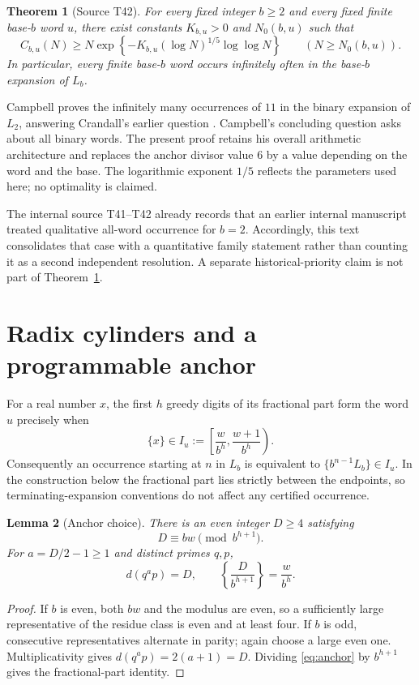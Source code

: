 \documentclass[11pt,a4paper]{article}
\newtheorem{theorem}{Theorem}[section]
\newtheorem{lemma}[theorem]{Lemma}
\theoremstyle{definition}\newtheorem{definition}[theorem]{Definition}
\theoremstyle{remark}\newtheorem{remark}[theorem]{Remark}
\begin{document}
\begin{theorem}[Source T42]\label{thm:main}
For every fixed integer $b\ge2$ and every fixed finite base-$b$ word $u$, there exist constants $K_{b,u}>0$ and $N_0(b,u)$ such that
\begin{equation}\label{eq:main}
 C_{b,u}(N)\ge N\exp\!\left\{-K_{b,u}(\log N)^{1/5}\log\log N\right\}
 \qquad(N\ge N_0(b,u)).
\end{equation}
In particular, every finite base-$b$ word occurs infinitely often in the base-$b$ expansion of $L_b$.
\end{theorem}

Campbell \cite{Campbell} proves the infinitely many occurrences of $11$ in the binary expansion of $L_2$, answering Crandall's earlier question \cite{Crandall}. Campbell's concluding question asks about all binary words. The present proof retains his overall arithmetic architecture and replaces the anchor divisor value $6$ by a value depending on the word and the base. The logarithmic exponent $1/5$ reflects the parameters used here; no optimality is claimed.

The internal source T41--T42 already records that an earlier internal manuscript treated qualitative all-word occurrence for $b=2$. Accordingly, this text consolidates that case with a quantitative family statement rather than counting it as a second independent resolution. A separate historical-priority claim is not part of Theorem~\ref{thm:main}.

\section{Radix cylinders and a programmable anchor}
For a real number $x$, the first $h$ greedy digits of its fractional part form the word $u$ precisely when
\[
 \{x\}\in I_u:=\left[\frac{w}{b^h},\frac{w+1}{b^h}\right).
\]
Consequently an occurrence starting at $n$ in $L_b$ is equivalent to $\{b^{n-1}L_b\}\in I_u$. In the construction below the fractional part lies strictly between the endpoints, so terminating-expansion conventions do not affect any certified occurrence.

\begin{lemma}[Anchor choice]\label{lem:anchor}
There is an even integer $D\ge4$ satisfying
\begin{equation}\label{eq:anchor}
 D\equiv bw\pmod {b^{h+1}}.
\end{equation}
For $a=D/2-1\ge1$ and distinct primes $q,p$,
\[
 d(q^ap)=D,
 \qquad
 \left\{\frac{D}{b^{h+1}}\right\}=\frac{w}{b^h}.
\]
\end{lemma}
\begin{proof}
If $b$ is even, both $bw$ and the modulus are even, so a sufficiently large representative of the residue class is even and at least four. If $b$ is odd, consecutive representatives alternate in parity; again choose a large even one. Multiplicativity gives $d(q^ap)=2(a+1)=D$. Dividing \eqref{eq:anchor} by $b^{h+1}$ gives the fractional-part identity.
\end{proof}
\end{document}
